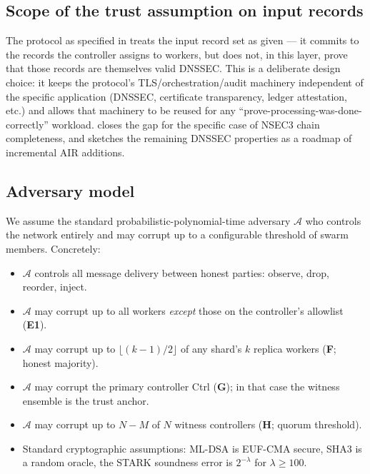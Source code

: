 \documentclass[11pt,a4paper]{article}
\theoremstyle{definition}
\theoremstyle{plain}
\newcommand{\msg}[1]{\textsf{#1}}
\newcommand{\ctrl}{\msg{Ctrl}}
\begin{document}
\subsection{Scope of the trust assumption on input records}

The protocol as specified in  treats the input
record set as given — it commits to the records the controller assigns
to workers, but does not, in this layer, prove that those records are
themselves valid DNSSEC.  This is a deliberate design choice: it keeps
the protocol's TLS/orchestration/audit machinery independent of the
specific application (DNSSEC, certificate transparency, ledger
attestation, etc.) and allows that machinery to be reused for any
``prove-processing-was-done-correctly'' workload.
 closes the gap for the specific case of NSEC3
chain completeness, and  sketches the
remaining DNSSEC properties as a roadmap of incremental AIR additions.

\subsection{Adversary model}

We assume the standard probabilistic-polynomial-time adversary $\mathcal{A}$
who controls the network entirely and may corrupt up to a configurable
threshold of swarm members.  Concretely:

\begin{itemize}[leftmargin=*]
  \item $\mathcal{A}$ controls all message delivery between honest parties:
        observe, drop, reorder, inject.
  \item $\mathcal{A}$ may corrupt up to all workers \emph{except} those
        on the controller's allowlist (\textbf{E1}).
  \item $\mathcal{A}$ may corrupt up to $\lfloor (k-1)/2 \rfloor$ of any
        shard's $k$ replica workers (\textbf{F}; honest majority).
  \item $\mathcal{A}$ may corrupt the primary controller \ctrl{} (\textbf{G});
        in that case the witness ensemble is the trust anchor.
  \item $\mathcal{A}$ may corrupt up to $N - M$ of $N$ witness
        controllers (\textbf{H}; quorum threshold).
  \item Standard cryptographic assumptions: ML-DSA is EUF-CMA secure,
        SHA3 is a random oracle, the STARK soundness error is
        $2^{-\lambda}$ for $\lambda \ge 100$.
\end{itemize}
\end{document}
